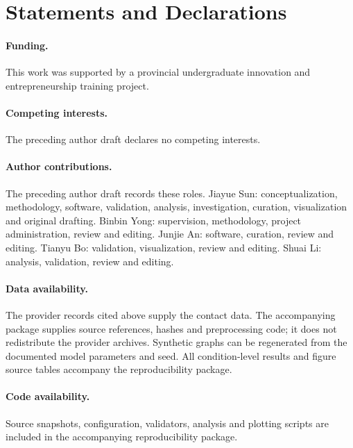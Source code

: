 \documentclass[smallextended]{svjour3}
\begin{document}
\section*{Statements and Declarations}
\paragraph{Funding.} This work was supported by a provincial undergraduate innovation and entrepreneurship training project.
\paragraph{Competing interests.} The preceding author draft declares no competing interests.
\paragraph{Author contributions.} The preceding author draft records these roles. Jiayue Sun: conceptualization, methodology, software, validation, analysis, investigation, curation, visualization and original drafting. Binbin Yong: supervision, methodology, project administration, review and editing. Junjie An: software, curation, review and editing. Tianyu Bo: validation, visualization, review and editing. Shuai Li: analysis, validation, review and editing.
\paragraph{Data availability.} The provider records cited above supply the contact data. The accompanying package supplies source references, hashes and preprocessing code; it does not redistribute the provider archives. Synthetic graphs can be regenerated from the documented model parameters and seed. All condition-level results and figure source tables accompany the reproducibility package.
\paragraph{Code availability.} Source snapshots, configuration, validators, analysis and plotting scripts are included in the accompanying reproducibility package.
\end{document}

